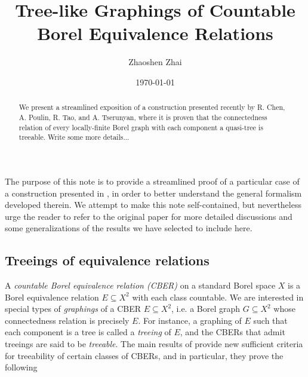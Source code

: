 \documentclass[reqno]{amsart}
\begin{document}
    \title{Tree-like Graphings of Countable Borel Equivalence Relations}
    \author{Zhaoshen Zhai}
    \address{Department of Mathematics and Statistics, McGill University, 805 Sherbrooke Street West, Montreal, QC, H3A 0B9, Canada}
    \date{\today}

    \begin{abstract}
        We present a streamlined exposition of a construction presented recently by R. Chen, A. Poulin, R. Tao, and A. Tserunyan, where it is proven that the connectedness relation of every locally-finite Borel graph with each component a quasi-tree is treeable. {\color{red}Write some more details...}
    \end{abstract}

    \maketitle


    The purpose of this note is to provide a streamlined proof of a particular case of a construction presented in \cite{CPTT23}, in order to better understand the general formalism developed therein. We attempt to make this note self-contained, but nevertheless urge the reader to refer to the original paper for more detailed discussions and some generalizations of the results we have selected to include here.

    \subsection*{Treeings of equivalence relations}

    A \textit{countable Borel equivalence relation (CBER)} on a standard Borel space $X$ is a Borel equivalence relation $E\subseteq X^2$ with each class countable. We are interested in special types of \textit{graphings} of a CBER $E\subseteq X^2$, i.e. a Borel graph $G\subseteq X^2$ whose connectedness relation is precisely $E$. For instance, a graphing of $E$ such that each component is a tree is called a \textit{treeing} of $E$, and the CBERs that admit treeings are said to be \textit{treeable}. The main results of \cite{CPTT23} provide new sufficient criteria for treeability of certain classes of CBERs, and in particular, they prove the following
\end{document}
